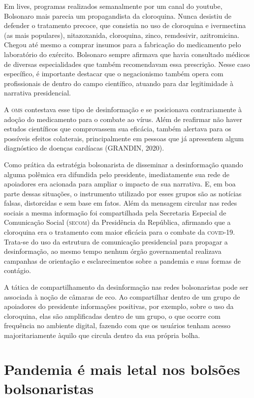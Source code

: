 Em lives, programas realizados semanalmente por um canal do youtube,
Bolsonaro mais parecia um propagandista da cloroquina. Nunca desistiu de
defender o tratamento precoce, que consistia no uso de cloroquina e
ivermectina (as mais populares), nitazoxanida, cloroquina, zinco,
remdesivir, azitromicina. Chegou até mesmo a comprar insumos para a
fabricação do medicamento pelo laboratório do exército. Bolsonaro sempre
afirmava que havia consultado médicos de diversas especialidades que
também recomendavam essa prescrição. Nesse caso específico, é importante
destacar que o negacionismo também opera com profissionais de dentro do
campo científico, atuando para dar legitimidade à narrativa
presidencial.

A \textsc{oms} contestava esse tipo de desinformação e se posicionava
contrariamente à adoção do medicamento para o combate ao vírus. Além de
reafirmar não haver estudos científicos que comprovassem sua eficácia,
também alertava para os possíveis efeitos colaterais, principalmente em
pessoas que já apresentem algum diagnóstico de doenças cardíacas
(GRANDIN, 2020).

Como prática da estratégia bolsonarista de disseminar a desinformação
quando alguma polêmica era difundida pelo presidente, imediatamente sua
rede de apoiadores era acionada para ampliar o impacto de sua narrativa.
E, em boa parte dessas situações, o instrumento utilizado por esses
grupos são as notícias falsas, distorcidas e sem base em fatos. Além da
mensagem circular nas redes sociais a mesma informação foi compartilhada
pela Secretaria Especial de Comunicação Social (\textsc{\textsc{secom}}) da Presidência da
República, afirmando que a cloroquina era o tratamento com maior
eficácia para o combate da \textsc{covid-19}. Trata-se do uso da estrutura de
comunicação presidencial para propagar a desinformação, ao mesmo tempo
nenhum órgão governamental realizava campanhas de orientação e
esclarecimentos sobre a pandemia e suas formas de contágio.

A tática de compartilhamento da desinformação nas redes bolsonaristas
pode ser associada à noção de câmaras de eco. Ao compartilhar dentro de
um grupo de apoiadores do presidente informações positivas, por exemplo,
sobre o uso da cloroquina, elas são amplificadas dentro de um grupo, o
que ocorre com frequência no ambiente digital, fazendo com que os
usuários tenham acesso majoritariamente àquilo que circula dentro da sua
própria bolha.

\section{Pandemia é mais letal nos bolsões bolsonaristas}

